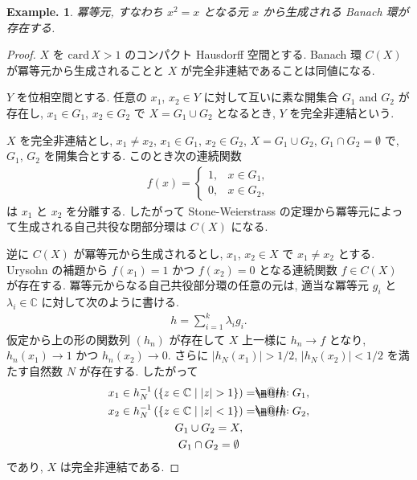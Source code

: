 \documentclass[openany, a4paper, oneside]{jsbook}
\makeatletter
\newcommand*{\eqdef}{=\mathrel{\hbox to 0pt{%
\raisebox{0.3ex}{$\m@th\cdot$}}%
\raisebox{-0.3ex}{$\m@th\cdot$}}%
}
\newcommand{\card}{\mathrm{card}\,}
\theoremstyle{break}
\theoremstyle{breakdefn}
\newtheorem{ex}[thm]{Example.}
\newcommand{\abs}[1]{\left|#1\right|}
\newcommand{\rbk}[1]{\left (#1\right)}
\newcommand{\relmiddle}[1]{\mathrel{}\middle#1\mathrel{}}
\newcommand{\set}[2]{\left\{#1 \relmiddle| #2\right\}}
\newcommand{\bbC}{\mathbb{C}}
\makeatother
\begin{document}
\begin{ex}
冪等元, すなわち $x^2 = x$ となる元 $x$ から生成される Banach 環が存在する.
\end{ex}
\begin{proof}
$X$ を $\card X >1$ のコンパクト Hausdorff 空間とする.
Banach 環 $C(X)$ が冪等元から生成されることと $X$ が完全非連結であることは同値になる.

$Y$ を位相空間とする.
任意の $x_1$, $x_2 \in Y$ に対して互いに素な開集合 $G_1$ and $G_2$ が存在し,
$x_1 \in G_1$, $x_2 \in G_2$ で $X = G_1 \cup G_2$ となるとき,
$Y$ を完全非連結という.

$X$ を完全非連結とし, $x_1 \neq x_2$, $x_1 \in G_1$,
$x_2 \in G_2$, $X = G_1 \cup G_2$, $G_1 \cap G_2 = \emptyset$ で,
$G_1$, $G_2$ を開集合とする.
このとき次の連続関数
\begin{align}
 f(x)
 =
 \begin{cases}
  1, & x \in G_1, \\
  0, & x \in G_2,
 \end{cases}
\end{align}
は $x_1$ と $x_2$ を分離する.
したがって Stone-Weierstrass の定理から冪等元によって生成される自己共役な閉部分環は $C(X)$ になる.

逆に $C(X)$ が冪等元から生成されるとし,
$x_1$, $x_2 \in X$ で $x_1 \neq x_2$ とする.
Urysohn の補題から $f(x_1) = 1$ かつ $f(x_2) = 0$ となる連続関数 $f \in C(X)$ が存在する.
冪等元からなる自己共役部分環の任意の元は, 適当な冪等元 $g_i$ と $\lambda_i \in \bbC$ に対して次のように書ける.
\begin{align}
 h
 =
 \sum_{i=1}^k \lambda_i g_i.
\end{align}
仮定から上の形の関数列 $\rbk{h_n}$ が存在して $X$ 上一様に $h_n \to f$ となり,
$h_n(x_1) \to 1$ かつ $h_n(x_2) \to 0$.
さらに $\abs{h_{N} (x_1)} > 1 / 2$, $\abs{h_N (x_2)} < 1 / 2$ を満たす自然数 $N$ が存在する.
したがって
\begin{gather}
 x_1
 \in
 h_N^{-1} \rbk{\set{z \in \bbC}{\abs{z} > 1}}
 \eqdef
 G_1, \\
 x_2
 \in
 h_N^{-1} \rbk{\set{z \in \bbC}{\abs{z} < 1}}
 \eqdef
 G_2, \\
 G_1 \cup G_2
 =
 X, \\
 G_1 \cap G_2
 =
 \emptyset
\end{gather}
であり, $X$ は完全非連結である.
\end{proof}
\end{document}
